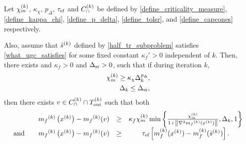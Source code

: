 % 

\begin{theorem}
\label{sufficient_reduction_theorem}
Let 
${\chi_m^{(k)}}$,
$\kappa_{\chi}$,
$p_{\Delta}$,
${\tau_{\textrm{ef}}}$
and ${C^{(k)}_{\cap}}$
be defined by
\cref{define_criticality_measure},
\cref{define_kappa_chi},
\cref{define_p_delta},
\cref{define_tolsr},
and \cref{define_capcones}
respectively.



Also, assume that ${{\hat s}^{(k)}}$ defined by \cref{half_tr_subproblem} satisfies \cref{what_ugc_satisfies} for some fixed constant $\kappa_f'>0$ independent of $k$.
Then, there exists and $\kappa_f>0$ and ${\Delta_{\textrm{sr}}}>0$, such that if during iteration $k$,
\begin{align}
{\chi_m^{(k)}} \ge \kappa_{\chi} \Delta_k^{p_{\Delta}}, \label{sr_chi_big_enough} \\
\Delta_k \le {\Delta_{\textrm{sr}}}, \label{sr_delta_small_enough}
\end{align}
then there exists $v \in {C^{(k)}_{\cap}} \cap {T_{\text{out}}^{(k)}}$ such that both
\begin{align*}
\begin{array}{cccc}
& {{m}_f}^{(k)}\left(x^{(k)}\right) - {{m}_f}^{(k)}(v) & \ge & \kappa_f {\chi_m^{(k)}} \min\left\{ \frac{{\chi_m^{(k)}}}{1+\left\|\nabla^2 {{m}_f}^{(k)}(x^{(k)})\right\|}, \Delta_k, 1 \right\} \\
\textrm{and} \quad & {{m}_f}^{(k)}\left(x^{(k)}\right) - {{m}_f}^{(k)}(v) &\ge& {\tau_{\textrm{ef}}}\left[m_f^{(k)}(x^{(k)}) - m_f^{(k)}({{\hat s}^{(k)}})\right].
\end{array}
\end{align*}

\end{theorem}

